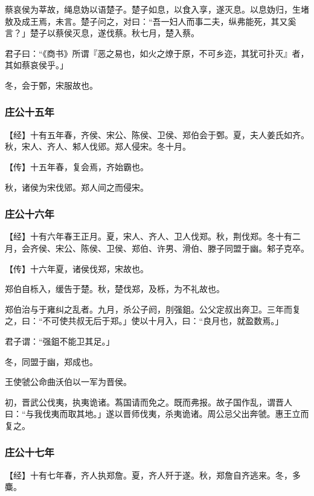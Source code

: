 \documentclass[]{article}
\begin{document}
蔡哀侯为莘故，绳息妫以语楚子。楚子如息，以食入享，遂灭息。以息妫归，生堵敖及成王焉，未言。楚子问之，对曰：``吾一妇人而事二夫，纵弗能死，其又奚言？」楚子以蔡侯灭息，遂伐蔡。秋七月，楚入蔡。

君子曰：``《商书》所谓『恶之易也，如火之燎于原，不可乡迩，其犹可扑灭』者，其如蔡哀侯乎。」

冬，会于鄄，宋服故也。

\hypertarget{header-n466}{%
\subsubsection{庄公十五年}\label{header-n466}}

【经】十有五年春，齐侯、宋公、陈侯、卫侯、郑伯会于鄄。夏，夫人姜氏如齐。秋，宋人、齐人、邾人伐郳。郑人侵宋。冬十月。

【传】十五年春，复会焉，齐始霸也。

秋，诸侯为宋伐郳。郑人间之而侵宋。

\hypertarget{header-n472}{%
\subsubsection{庄公十六年}\label{header-n472}}

【经】十有六年春王正月。夏，宋人、齐人、卫人伐郑。秋，荆伐郑。冬十有二月，会齐侯、宋公、陈侯、卫侯、郑伯、许男、滑伯、滕子同盟于幽。邾子克卒。

【传】十六年夏，诸侯伐郑，宋故也。

郑伯自栎入，缓告于楚。秋，楚伐郑，及栎，为不礼故也。

郑伯治与于雍纠之乱者。九月，杀公子阏，刖强鉏。公父定叔出奔卫。三年而复之，曰：``不可使共叔无后于郑。」使以十月入，曰：``良月也，就盈数焉。」

君子谓：``强鉏不能卫其足。」

冬，同盟于幽，郑成也。

王使虢公命曲沃伯以一军为晋侯。

初，晋武公伐夷，执夷诡诸。蒍国请而免之。既而弗报。故子国作乱，谓晋人曰：``与我伐夷而取其地。」遂以晋师伐夷，杀夷诡诸。周公忌父出奔虢。惠王立而复之。

\hypertarget{header-n483}{%
\subsubsection{庄公十七年}\label{header-n483}}

【经】十有七年春，齐人执郑詹。夏，齐人歼于遂。秋，郑詹自齐逃来。冬，多麋。
\end{document}

